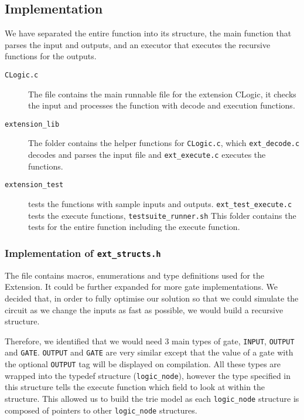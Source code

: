 \documentclass[11pt]{article}
\begin{document}
\subsection{Implementation}

We have separated the entire function into its structure, the main function that parses the input and outputs, and an executor that executes the recursive functions for the outputs.

\begin{description}
\item [\texttt{CLogic.c}] The file contains the main runnable file for the extension CLogic, it checks the input and processes the function with decode and execution functions.
\item [\texttt{extension\_lib}] The folder contains the helper functions for \texttt{CLogic.c}, which \texttt{ext\_decode.c} decodes and parses the input file and \texttt{ext\_execute.c} executes the functions.
\item [\texttt{extension\_test}] tests the functions with sample inputs and outputs. \texttt{ext\_test\_execute.c} tests the execute functions, \texttt{testsuite\_runner.sh} This folder contains the tests for the entire function including the execute function.
\end{description}

\subsubsection{Implementation of \texttt{ext\_structs.h}}
The file contains macros, enumerations and type definitions used for the Extension. It could be further expanded for more gate implementations. We decided that, in order to fully optimise our solution so that we could simulate the circuit as we change the inputs as fast as possible, we would build a recursive structure.

Therefore, we identified that we would need 3 main types of gate, \texttt{INPUT}, \texttt{OUTPUT} and \texttt{GATE}. \texttt{OUTPUT} and \texttt{GATE} are very similar except that the value of a gate with the optional \texttt{OUTPUT} tag will be displayed on compilation. All these types are wrapped into the typedef structure (\texttt{logic\_node}), however the type specified in this structure tells the execute function which field to look at within the structure. This allowed us to build the trie model as each \texttt{logic\_node} structure is composed of pointers to other \texttt{logic\_node} structures.
\end{document}
